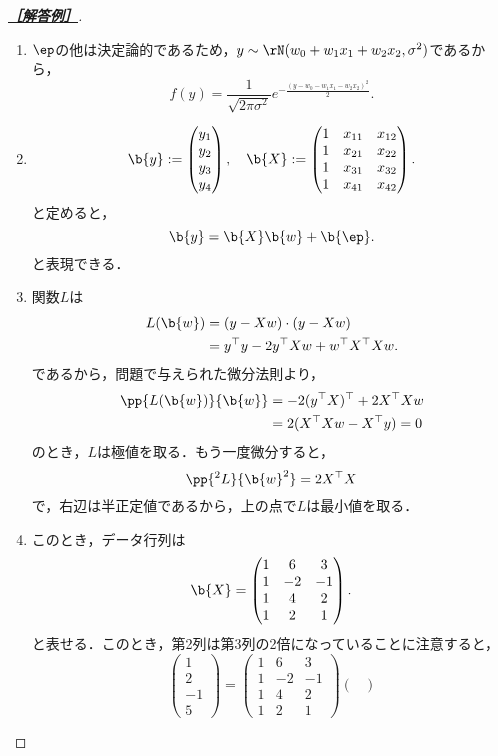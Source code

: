 \documentclass[uplatex,dvipdfmx]{jsarticle}
\begin{document}
\begin{proof}[\textbf{\underline{［解答例］}}]\mbox{}
    \begin{enumerate}
        \item $\ep$の他は決定論的であるため，$y\sim\rN(w_0+w_1x_1+w_2x_2,\sigma^2)$であるから，
        \[f(y)=\frac{1}{\sqrt{2\pi\sigma^2}}e^{-\frac{(y-w_0-w_1x_1-w_2x_2)^2}{2}}.\]
        \item \[\b{y}:=\begin{pmatrix}y_1\\y_2\\y_3\\y_4\end{pmatrix},\quad \b{X}:=\begin{pmatrix}1&x_{11}&x_{12}\\1&x_{21}&x_{22}\\1&x_{31}&x_{32}\\1&x_{41}&x_{42}\end{pmatrix}.\]
        と定めると，
        \[\b{y}=\b{X}\b{w}+\b{\ep}.\]
        と表現できる．
        \item 関数$L$は
        \begin{align*}
            L(\b{w})&=(y-Xw)\cdot(y-Xw)\\
            &=y^\top y-2y^\top Xw+w^\top X^\top Xw.
        \end{align*}
        であるから，問題で与えられた微分法則より，
        \begin{align*}
            \pp{L(\b{w})}{\b{w}}&=-2(y^\top X)^\top+2X^\top Xw\\
            &=2(X^\top Xw-X^\top y)=0
        \end{align*}
        のとき，$L$は極値を取る．もう一度微分すると，
        \[\pp{^2L}{\b{w}^2}=2X^\top X\]
        で，右辺は半正定値であるから，上の点で$L$は最小値を取る．
        \item このとき，データ行列は
        \[\b{X}=\begin{pmatrix}1&6&3\\1&-2&-1\\1&4&2\\1&2&1\end{pmatrix}.\]
        と表せる．このとき，第2列は第3列の2倍になっていることに注意すると，
        \[\begin{pmatrix}
            1\\2\\-1\\5
        \end{pmatrix}=\begin{pmatrix}1&6&3\\1&-2&-1\\1&4&2\\1&2&1\end{pmatrix}\begin{pmatrix}

\end{pmatrix}\]
\end{enumerate}
\end{proof}
\end{document}
